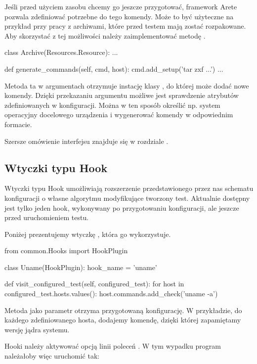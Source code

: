 \documentclass[00-praca-magisterska.tex]{subfiles}
\begin{document}
Jeśli przed użyciem zasobu chcemy go jeszcze przygotować, framework Arete
pozwala zdefiniować potrzebne do tego komendy. Może to być użyteczne na
przykład przy pracy z archiwami, które przed testem mają zostać rozpakowane. Aby
skorzystać z tej możliwości należy zaimplementować metodę
.

\begin{pythoncode}
  class Archive(Resources.Resource):
      ...

      def generate_commands(self, cmd, host):
          cmd.add_setup('tar zxf ...')
	  ...
\end{pythoncode}

Metoda ta w argumentach otrzymuje instację klasy , do której
może dodać nowe komendy. Dzięki przekazaniu argumentu  możliwe jest
sprawdzenie atrybutów zdefiniowanych w konfiguracji. Można w ten sposób
określić np. system operacyjny docelowego urządzenia i wygenerować komendy w
odpowiednim formacie.

Szersze omówienie interfejsu  znajduje się w rozdziale
.

\subsection{Wtyczki typu Hook}

Wtyczki typu Hook umożliwiają rozszerzenie przedstawionego przez nas schematu
konfiguracji o własne algorytmu modyfikujące tworzony test. Aktualnie dostępny
jest tylko jeden hook, wykonywany po przygotowaniu konfiguracji, ale jeszcze
przed uruchomieniem testu.

Poniżej prezentujemy wtyczkę , która go wykorzystuje.

\begin{pythoncode}
  from common.Hooks import HookPlugin
  
  class Uname(HookPlugin):
      hook_name = 'uname'
  
      def visit_configured_test(self, configured_test):
          for host in configured_test.hosts.values():
              host.commands.add_check('uname -a')
\end{pythoncode}

Metoda  jako parametr otrzyma przygotowaną
konfigurację. W przykładzie, do każdego zdefiniowanego hosta, dodajemy komendę,
dzięki której zapamiętamy wersję jądra systemu.

Hooki należy aktywować opcją linii poleceń . W tym wypadku
program należałoby więc uruchomić tak:
\end{document}
